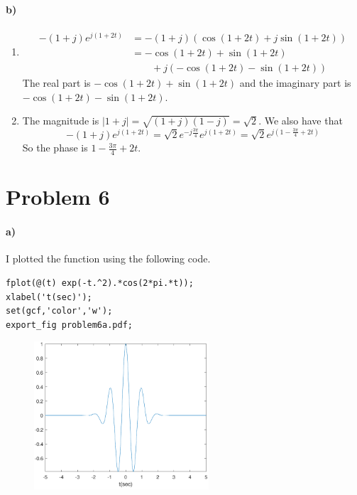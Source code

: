 \documentclass[12pt]{article}
\begin{document}
\paragraph{b)}

\begin{enumerate}
	\item
	\begin{align*}
		-(1+j)e^{j(1+2t)}&=-(1+j)(\cos(1+2t)+j\sin(1+2t))\\
		&=-\cos(1+2t)+\sin(1+2t)\\
		&\qquad+j(-\cos(1+2t)-\sin(1+2t))
	\end{align*}
	The real part is \(-\cos(1+2t)+\sin(1+2t)\) and the imaginary part is \(-\cos(1+2t)-\sin(1+2t)\).
	\item The magnitude is \(|1+j|=\sqrt{(1+j)(1-j)}=\sqrt{2}\). We also have that
	\[-(1+j)e^{j(1+2t)}=\sqrt{2}e^{-j\frac{3\pi}{4}}e^{j(1+2t)}=\sqrt{2}e^{j\left(1-\frac{3\pi}{4}+2t\right)}\]
	So the phase is \(1-\frac{3\pi}{4}+2t\).
\end{enumerate}

\section*{Problem 6}

\paragraph{a)}

I plotted the function using the following code.
\begin{verbatim}
fplot(@(t) exp(-t.^2).*cos(2*pi.*t));
xlabel('t(sec)');
set(gcf,'color','w');
export_fig problem6a.pdf;
\end{verbatim}
\begin{figure}[H]
    \begin{center}
        \includegraphics[width=2.56in]{problem6a.pdf}
    \end{center}
\end{figure}
\end{document}
